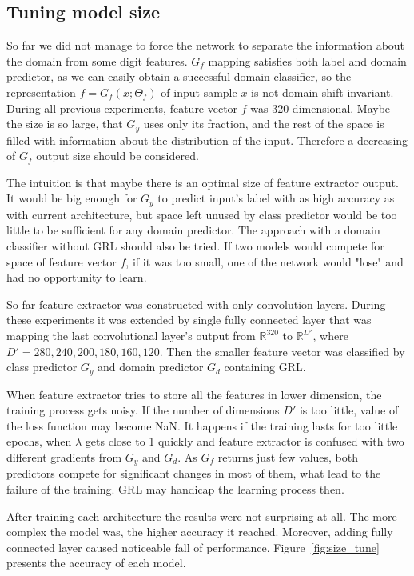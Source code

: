 \documentclass{article}
\begin{document}
\subsection{Tuning model size}
So far we did not manage to force the network to separate the information about the domain from some digit features. $G_{f}$ mapping satisfies both label and domain predictor, as we can easily obtain a successful domain classifier, so the representation $f=G_{f}(x;\Theta_{f})$ of input sample $x$ is not domain shift invariant. During all previous experiments, feature vector $f$ was 320-dimensional. Maybe the size is so large, that $G_{y}$ uses only its fraction, and the rest of the space is filled with information about the distribution of the input. Therefore a decreasing of $G_{f}$ output size should be considered.
\par
The intuition is that maybe there is an optimal size of feature extractor output. It would be big enough for $G_{y}$ to predict input's label with as high accuracy as with current architecture, but space left unused by class predictor would be too little to be sufficient for any domain predictor. The approach with a domain classifier without GRL should also be tried. If two models would compete for space of feature vector $f$, if it was too small, one of the network would "lose" and had no opportunity to learn.
\par
So far feature extractor was constructed with only convolution layers. During these experiments it was extended by single fully connected layer that was mapping the last convolutional layer's output from $\mathbb{R}^{320}$ to $\mathbb{R}^{D'}$, where $D' = 280, 240, 200, 180, 160, 120$. Then the smaller feature vector was classified by class predictor $G_{y}$ and domain predictor $G_{d}$ containing GRL. 
\par
When feature extractor tries to store all the features in lower dimension, the training process gets noisy. If the number of dimensions $D'$ is too little, value of the loss function may become NaN. It happens if the training lasts for too little epochs, when $\lambda$ gets close to 1 quickly and feature extractor is confused with two different gradients from $G_{y}$ and $G_{d}$. As $G_{f}$ returns just few values, both predictors compete for significant changes in most of them, what lead to the failure of the training. GRL may handicap the learning process then.
\par
After training each architecture the results were not surprising at all. The more complex the model was, the higher accuracy it reached. Moreover, adding fully connected layer caused noticeable fall of performance.  Figure~\ref{fig:size_tune} presents the accuracy of each model. 
\end{document}
